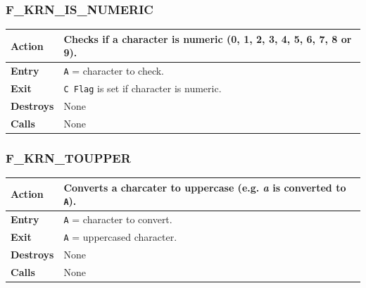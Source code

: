 \documentclass[a4paper,11pt]{article}
\begin{document}
        \subsubsection{F\_KRN\_IS\_NUMERIC}
        \label{func:fkrnisnumeric}
        \begin{tabular}{l p{9cm}}
            \hline\textbf{Action}
            & Checks if a character is numeric (0, 1, 2, 3, 4, 5, 6, 7, 8 or 9).\\
            \hline\textbf{Entry} & \texttt{A} = character to check.\\
            \hline\textbf{Exit} & \texttt{C Flag} is set if character is numeric.\\
            \hline\textbf{Destroys} & None\\
            \hline\textbf{Calls} & None\\
            \hline
        \end{tabular}

        \subsubsection{F\_KRN\_TOUPPER}
        \label{func:fkrntoupper}
        \begin{tabular}{l p{9cm}}
            \hline\textbf{Action}
            & Converts a charcater to uppercase (e.g. \textit{a} is converted to
            \texttt{A}).\\
            \hline\textbf{Entry} & \texttt{A} = character to convert.\\
            \hline\textbf{Exit} & \texttt{A} = uppercased character.\\
            \hline\textbf{Destroys} & None\\
            \hline\textbf{Calls} & None\\
            \hline
        \end{tabular}

\end{document}
